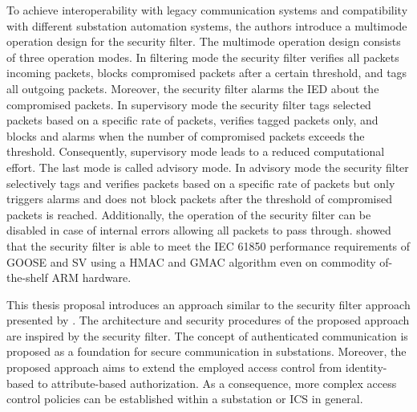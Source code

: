 To achieve interoperability with legacy communication systems and compatibility with different substation automation systems, the authors introduce a multimode operation design for the security filter.
The multimode operation design consists of three operation modes.
In filtering mode the security filter verifies all packets incoming packets, blocks compromised packets after a certain threshold, and tags all outgoing packets.
Moreover, the security filter alarms the IED about the compromised packets.
In supervisory mode the security filter tags selected packets based on a specific rate of packets, verifies tagged packets only, and blocks and alarms when the number of compromised packets exceeds the threshold.
Consequently, supervisory mode leads to a reduced computational effort.
The last mode is called advisory mode.
In advisory mode the security filter selectively tags and verifies packets based on a specific rate of packets but only triggers alarms and does not block packets after the threshold of compromised packets is reached.
Additionally, the operation of the security filter can be disabled in case of internal errors allowing all packets to pass through.
\citeauthor{Ishchenko2018} showed that the security filter is able to meet the IEC 61850 performance requirements of GOOSE and SV \cite{IEC61850P5} using a HMAC and GMAC algorithm even on commodity of-the-shelf ARM hardware.

This thesis proposal introduces an approach similar to the security filter approach presented by \citeauthor{Ishchenko2018}.
The architecture and security procedures of the proposed approach are inspired by the security filter.
The concept of authenticated communication is proposed as a foundation for secure communication in substations.
Moreover, the proposed approach aims to extend the employed access control from identity-based to attribute-based authorization.
As a consequence, more complex access control policies can be established within a substation or ICS in general.

